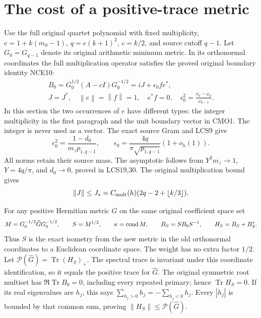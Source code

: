 \documentclass[11pt,a4paper]{article}
\providecommand{\Tr}{\operatorname{Tr}}
\providecommand{\norm}[1]{\left\lVert#1\right\rVert}
\begin{document}
\section{The cost of a positive-trace metric}
Use the full original quartet polynomial with fixed multiplicity,
$e=1+k(m_0-1)$, $q=e(k+1)^2$, $c=k/2$, and source cutoff $q-1$.
Let $G_0=G_{q-1}$ denote its original arithmetic minimum metric.
In its orthonormal coordinates the full multiplication operator
satisfies the proved original boundary identity NCE10:
\begin{equation}\tag{CMO1}
 \begin{gathered}
 B_0=G_0^{1/2}(A-cI)G_0^{-1/2}=iJ+\epsilon_0fe^*,\\
 J=J^*,\quad \norm e=\norm f=1,\quad e^*f=0,\quad
 \epsilon_0^2=\frac{\nu_0-\omega_q}{\omega_{q-1}} .
 \end{gathered}
\end{equation}
In this section the two occurrences of $e$ have different types:
the integer multiplicity in the first paragraph and the unit
boundary vector in CMO1. The integer is never used as a vector.
The exact source Gram and LCS9 give
\begin{equation}\tag{CMO2}
 \epsilon_0^2=\frac{1-d_0}{m_zp_{1,q-1}},\qquad
 \epsilon_0=\frac{4q}{\pi\sqrt{p_{1,q-1}}}(1+o_h(1)).
\end{equation}
All norms retain their source mass. The asymptotic follows from
$Y^2m_z\to1$, $Y=4q/\pi$, and $d_0\to0$, proved in LCS19,30.
The original multiplication bound gives
\[
 \norm J\le J_*=
 C_{\rm mult}(h)(2q-2+\lfloor k/3\rfloor).
\]

For any positive Hermitian metric $\widehat G$ on the same
original coefficient space set
\[
 M=G_0^{-1/2}\widehat G G_0^{-1/2},\qquad
 S=M^{1/2},\qquad \kappa=\operatorname{cond} M,\qquad
 B_S=SB_0S^{-1},\qquad H_S=B_S+B_S^* .
\]
Thus $S$ is the exact isometry from the new metric in the old
orthonormal coordinates to a Euclidean coordinate space.
The weight has no extra factor $1/2$.
Let $\mathcal P(\widehat G)=\Tr(H_S)_+$.
The spectral trace is invariant under this coordinate
identification, so it equals the positive trace for $\widehat G$.
The original symmetric root multiset has $\Re\Tr B_0=0$,
including every repeated primary; hence $\Tr H_S=0$.
If its real eigenvalues are $h_j$, this says
$\sum_{h_j>0}h_j=-\sum_{h_j<0}h_j$.
Every $|h_j|$ is bounded by that common sum, proving
$\norm{H_S}\le\mathcal P(\widehat G)$.
\end{document}

